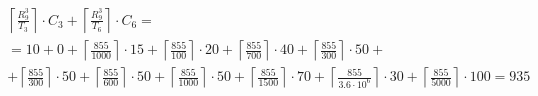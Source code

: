 \begin{gather*}
\begin{multlined}
    \left\lceil\frac{R_9^3}{T_3}\right\rceil\cdot C_3 +%
    \left\lceil\frac{R_9^3}{T_6}\right\rceil\cdot C_6 = \\%
    = 10 + 0 + \left\lceil\frac{855}{1000}\right\rceil\cdot 15 + %
    \left\lceil\frac{855}{100}\right\rceil\cdot 20 + %
    \left\lceil\frac{855}{700}\right\rceil\cdot 40 + %
    \left\lceil\frac{855}{300}\right\rceil\cdot 50 + \\%
    + \left\lceil\frac{855}{300}\right\rceil\cdot 50 + %
    \left\lceil\frac{855}{600}\right\rceil\cdot 50 + %
    \left\lceil\frac{855}{1000}\right\rceil\cdot 50 +%
    \left\lceil\frac{855}{1500}\right\rceil\cdot 70 +%
    \left\lceil\frac{855}{3.6 \cdot 10^6}\right\rceil\cdot 30 +%
    \left\lceil\frac{855}{5000}\right\rceil\cdot 100 = 935 \\
  \end{multlined} \\
\end{gather*}
